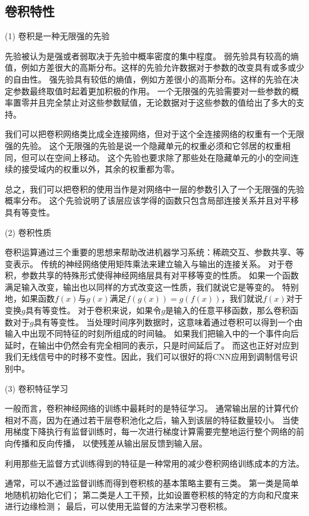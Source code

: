 \subsection{卷积特性}
(1) 卷积是一种无限强的先验\par
先验被认为是强或者弱取决于先验中概率密度的集中程度。
弱先验具有较高的熵值，例如方差很大的高斯分布。这样的先验允许数据对于参数的改变具有或多或少的自由性。
强先验具有较低的熵值，例如方差很小的高斯分布。这样的先验在决定参数最终取值时起着更加积极的作用。
一个无限强的先验需要对一些参数的概率置零并且完全禁止对这些参数赋值，无论数据对于这些参数的值给出了多大的支持。\par
我们可以把卷积网络类比成全连接网络，但对于这个全连接网络的权重有一个无限强的先验。
这个无限强的先验是说一个隐藏单元的权重必须和它邻居的权重相同，但可以在空间上移动。
这个先验也要求除了那些处在隐藏单元的小的空间连续的接受域内的权重以外，其余的权重都为零。\par
总之，我们可以把卷积的使用当作是对网络中一层的参数引入了一个无限强的先验概率分布。
这个先验说明了该层应该学得的函数只包含局部连接关系并且对平移具有等变性。\par

(2) 卷积性质\par
卷积运算通过三个重要的思想来帮助改进机器学习系统：稀疏交互、参数共享、等变表示。
传统的神经网络使用矩阵乘法来建立输入与输出的连接关系。
对于卷积，参数共享的特殊形式使得神经网络层具有对平移等变的性质。
如果一个函数满足输入改变，输出也以同样的方式改变这一性质，我们就说它是等变的。
特别地，如果函数$f(x)$与$g(x)$满足$f(g(x))= g(f(x))$，我们就说$f(x)$对于变换$g$具有等变性。
对于卷积来说，如果令$g$是输入的任意平移函数，那么卷积函数对于$g$具有等变性。
当处理时间序列数据时，这意味着通过卷积可以得到一个由输入中出现不同特征的时刻所组成的时间轴。
如果我们把输入中的一个事件向后延时，在输出中仍然会有完全相同的表示，只是时间延后了。
而这也正好对应到我们无线信号中的时移不变性。因此，我们可以很好的将CNN应用到调制信号识别中。\par

(3) 卷积特征学习\par
一般而言，卷积神经网络的训练中最耗时的是特征学习。
通常输出层的计算代价相对不高，因为在通过若干层卷积池化之后，输入到该层的特征数量较小。
当使用梯度下降执行有监督训练时，每一次进行梯度计算需要完整地运行整个网络的前向传播和反向传播，
以使残差从输出层反馈到输入层。

利用那些无监督方式训练得到的特征是一种常用的减少卷积网络训练成本的方法。\par

通常，可以不通过监督训练而得到卷积核的基本策略主要有三类。
第一类是简单地随机初始化它们；
第二类是人工干预，比如设置卷积核的特定的方向和尺度来进行边缘检测；
最后，可以使用无监督的方法来学习卷积核。\par

